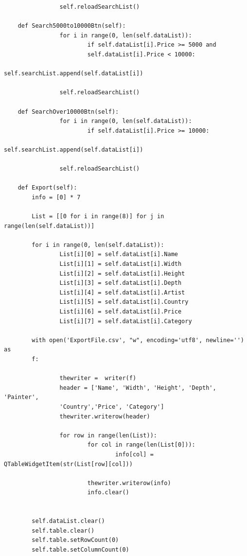 \documentclass[12pt]{article}
\begin{document}
\begin{verbatim}
                self.reloadSearchList()

    def Search5000to10000Btn(self):
                for i in range(0, len(self.dataList)):
                        if self.dataList[i].Price >= 5000 and
                        self.dataList[i].Price < 10000:
                                self.searchList.append(self.dataList[i])
                
                self.reloadSearchList()

    def SearchOver10000Btn(self):
                for i in range(0, len(self.dataList)):
                        if self.dataList[i].Price >= 10000:
                                self.searchList.append(self.dataList[i])
                
                self.reloadSearchList()

    def Export(self):
        info = [0] * 7

        List = [[0 for i in range(8)] for j in range(len(self.dataList))]

        for i in range(0, len(self.dataList)):
                List[i][0] = self.dataList[i].Name
                List[i][1] = self.dataList[i].Width
                List[i][2] = self.dataList[i].Height
                List[i][3] = self.dataList[i].Depth
                List[i][4] = self.dataList[i].Artist
                List[i][5] = self.dataList[i].Country
                List[i][6] = self.dataList[i].Price
                List[i][7] = self.dataList[i].Category

        with open('ExportFile.csv', "w", encoding='utf8', newline='') as
        f:
    
                thewriter =  writer(f)
                header = ['Name', 'Width', 'Height', 'Depth', 'Painter',
                'Country','Price', 'Category']
                thewriter.writerow(header)

                for row in range(len(List)):
                        for col in range(len(List[0])):
                                info[col] = QTableWidgetItem(str(List[row][col]))

                        thewriter.writerow(info)
                        info.clear()


        self.dataList.clear()
        self.table.clear()
        self.table.setRowCount(0)
        self.table.setColumnCount(0)

        


\end{verbatim}
\end{document}
